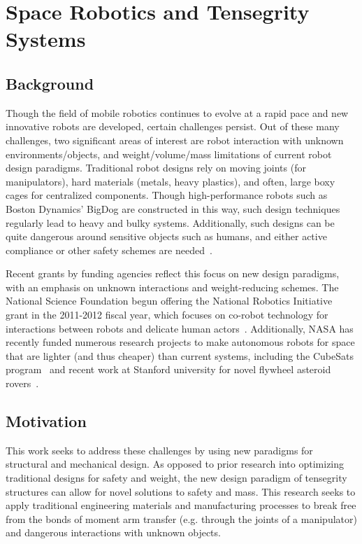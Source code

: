 \documentclass[12pt]{report}
\begin{document}
\chapter{Space Robotics and Tensegrity Systems}

\section{Background}

Though the field of mobile robotics continues to evolve at a rapid pace and new innovative robots are developed, certain challenges persist.
Out of these many challenges, two significant areas of interest are robot interaction with unknown environments/objects, and weight/volume/mass limitations of current robot design paradigms.
Traditional robot designs rely on moving joints (for manipulators), hard materials (metals, heavy plastics), and often, large boxy cages for centralized components.
Though high-performance robots such as Boston Dynamics' BigDog \cite{raibert2008bigdog} are constructed in this way, such design techniques regularly lead to heavy and bulky systems.
Additionally, such designs can be quite dangerous around sensitive objects such as humans, and either active compliance or other safety schemes are needed~\cite{garcia2007evolution,lefebvre2005active}.

Recent grants by funding agencies reflect this focus on new design paradigms, with an emphasis on unknown interactions and weight-reducing schemes.
The National Science Foundation begun offering the National Robotics Initiative grant in the 2011-2012 fiscal year, which focuses on co-robot technology for interactions between robots and delicate human actors~\cite{nsf2014national}.
Additionally, NASA has recently funded numerous research projects to make autonomous robots for space that are lighter (and thus cheaper) than current systems, including the CubeSats program~\cite{chin2008standardization,selva2012survey} and recent work at Stanford university for novel flywheel asteroid rovers~\cite{allen2013internally}.


\section{Motivation}
This work seeks to address these challenges by using new paradigms for structural and mechanical design.
As opposed to prior research into optimizing traditional designs for safety and weight, the new design paradigm of tensegrity structures can allow for novel solutions to safety and mass.
This research seeks to apply traditional engineering materials and manufacturing processes to break free from the bonds of moment arm transfer (e.g. through the joints of a manipulator) and dangerous interactions with unknown objects.
\end{document}
